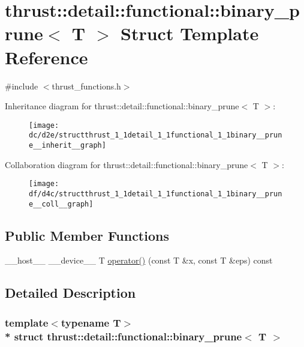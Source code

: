 \hypertarget{structthrust_1_1detail_1_1functional_1_1binary__prune}{}\section{thrust\+:\+:detail\+:\+:functional\+:\+:binary\+\_\+prune$<$ T $>$ Struct Template Reference}
\label{structthrust_1_1detail_1_1functional_1_1binary__prune}


{\ttfamily \#include $<$thrust\+\_\+functions.\+h$>$}



Inheritance diagram for thrust\+:\+:detail\+:\+:functional\+:\+:binary\+\_\+prune$<$ T $>$\+:
\nopagebreak
\begin{figure}[H]
\begin{center}
\leavevmode
\texttt{[image: dc/d2e/structthrust\_1\_1detail\_1\_1functional\_1\_1binary\_\_prune\_\_inherit\_\_graph]}
\end{center}
\end{figure}


Collaboration diagram for thrust\+:\+:detail\+:\+:functional\+:\+:binary\+\_\+prune$<$ T $>$\+:
\nopagebreak
\begin{figure}[H]
\begin{center}
\leavevmode
\texttt{[image: df/d4c/structthrust\_1\_1detail\_1\_1functional\_1\_1binary\_\_prune\_\_coll\_\_graph]}
\end{center}
\end{figure}
\subsection*{Public Member Functions}
\begin{DoxyCompactItemize}
\item 
\+\_\+\+\_\+host\+\_\+\+\_\+ \+\_\+\+\_\+device\+\_\+\+\_\+ T \hyperlink{structthrust_1_1detail_1_1functional_1_1binary__prune_a721994995b68481a8729281e2166a128}{operator()} (const T \&x, const T \&eps) const 
\end{DoxyCompactItemize}


\subsection{Detailed Description}
\subsubsection*{template$<$typename T$>$\\*
struct thrust\+::detail\+::functional\+::binary\+\_\+prune$<$ T $>$}



